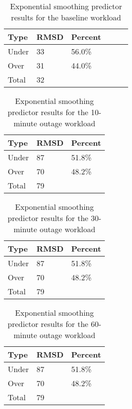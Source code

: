 \begin{table}[H]
\centering
\begin{tabular}{| l | l | l | l | l | l |}
\hline
Type & RMSD & Percent \\ \hline
Under & 33 & 56.0\% \\ \hline
Over & 31 & 44.0\% \\ \hline
Total & 32 & \\ \hline
\end{tabular}
\caption{Exponential smoothing predictor results for the baseline workload}
\end{table}


\begin{table}[H]
\centering
\begin{tabular}{| l | l | l |}
\hline
Type & RMSD & Percent \\ \hline
Under & 87 & 51.8\% \\ \hline
Over & 70 & 48.2\% \\ \hline
Total & 79 & \\ \hline
\end{tabular}
\caption{Exponential smoothing predictor results for the 10-minute outage workload}
\end{table}

\begin{table}[H]
\centering
\begin{tabular}{| l | l | l |}
\hline
Type & RMSD & Percent \\ \hline
Under & 87 & 51.8\% \\ \hline
Over & 70 & 48.2\% \\ \hline
Total & 79 & \\ \hline
\end{tabular}
\caption{Exponential smoothing predictor results for the 30-minute outage workload}
\end{table}

\begin{table}[H]
\centering
\begin{tabular}{| l | l | l |}
\hline
Type & RMSD & Percent \\ \hline
Under & 87 & 51.8\% \\ \hline
Over & 70 & 48.2\% \\ \hline
Total & 79 & \\ \hline
\end{tabular}
\caption{Exponential smoothing predictor results for the 60-minute outage workload}
\end{table}

